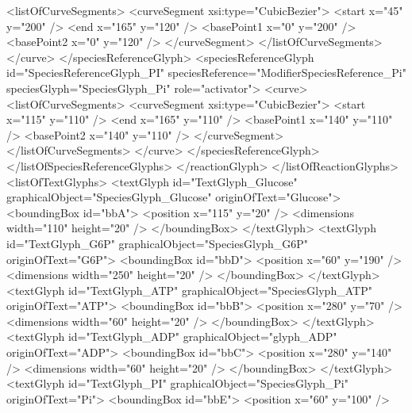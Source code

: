 \begin{example}
                  <listOfCurveSegments>
                    <curveSegment xsi:type="CubicBezier">
                      <start x="45" y="200" />
                      <end x="165" y="120" />
                      <basePoint1 x="0" y="200" />
                      <basePoint2 x="0" y="120" />
                    </curveSegment>
                  </listOfCurveSegments>
                </curve>
              </speciesReferenceGlyph>
              <speciesReferenceGlyph id="SpeciesReferenceGlyph_PI"
                    speciesReference="ModifierSpeciesReference_Pi"
                    speciesGlyph="SpeciesGlyph_Pi" role="activator">
                <curve>
                  <listOfCurveSegments>
                    <curveSegment xsi:type="CubicBezier">
                      <start x="115" y="110" />
                      <end x="165" y="110" />
                      <basePoint1 x="140" y="110" />
                      <basePoint2 x="140" y="110" />
                    </curveSegment>
                  </listOfCurveSegments>
                </curve>
              </speciesReferenceGlyph>
            </listOfSpeciesReferenceGlyphs>
          </reactionGlyph>
        </listOfReactionGlyphs>
        <listOfTextGlyphs>
          <textGlyph id="TextGlyph_Glucose" graphicalObject="SpeciesGlyph_Glucose"
                     originOfText="Glucose">
            <boundingBox id="bbA">
              <position x="115" y="20" />
              <dimensions width="110" height="20" />
            </boundingBox>
          </textGlyph>
          <textGlyph id="TextGlyph_G6P" graphicalObject="SpeciesGlyph_G6P" 
                     originOfText="G6P">
            <boundingBox id="bbD">
              <position x="60" y="190" />
              <dimensions width="250" height="20" />
            </boundingBox>
          </textGlyph>
          <textGlyph id="TextGlyph_ATP" graphicalObject="SpeciesGlyph_ATP"
                     originOfText="ATP">
            <boundingBox id="bbB">
              <position x="280" y="70" />
              <dimensions width="60" height="20" />
            </boundingBox>
          </textGlyph>
          <textGlyph id="TextGlyph_ADP" graphicalObject="glyph_ADP"
                     originOfText="ADP">
            <boundingBox id="bbC">
              <position x="280" y="140" />
              <dimensions width="60" height="20" />
            </boundingBox>
          </textGlyph>
          <textGlyph id="TextGlyph_PI" graphicalObject="SpeciesGlyph_Pi"
                     originOfText="Pi">
            <boundingBox id="bbE">
              <position x="60" y="100" />

\end{example}
